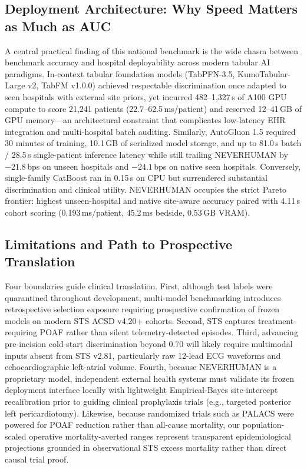 \subsection{Deployment Architecture: Why Speed Matters as Much as AUC}
A central practical finding of this national benchmark is the wide chasm between benchmark accuracy and hospital deployability across modern tabular AI paradigms. In-context tabular foundation models (TabPFN-3.5, KumoTabular-Large v2, TabFM v1.0.0) achieved respectable discrimination once adapted to seen hospitals with external site priors, yet incurred 482--1,327\,s of A100 GPU compute to score 21,241 patients (22.7--62.5\,ms/patient) and reserved 12--41\,GB of GPU memory---an architectural constraint that complicates low-latency EHR integration and multi-hospital batch auditing. Similarly, AutoGluon 1.5  required 30 minutes of training, 10.1\,GB of serialized model storage, and up to 81.0\,s batch / 28.5\,s single-patient inference latency while still trailing NEVERHUMAN by $-21.8$\,bps on unseen hospitals and $-24.1$\,bps on native  seen hospitals. Conversely, single-family CatBoost ran in 0.15\,s on CPU but surrendered substantial discrimination and clinical utility. NEVERHUMAN occupies the strict Pareto frontier: highest unseen-hospital and native site-aware accuracy paired with 4.11\,s cohort scoring (0.193\,ms/patient, 45.2\,ms bedside, 0.53\,GB VRAM).

\subsection{Limitations and Path to Prospective Translation}
Four boundaries guide clinical translation. First, although test labels were quarantined throughout development, multi-model benchmarking introduces retrospective selection exposure requiring prospective confirmation of frozen models on modern STS ACSD v4.20+ cohorts.\cite{dwork2015reusable} Second, STS  captures treatment-requiring POAF rather than silent telemetry-detected episodes.\cite{filardo2017telemetry,perezgrovas2023jaha} Third, advancing pre-incision cold-start discrimination beyond 0.70 will likely require multimodal inputs absent from STS v2.81, particularly raw 12-lead ECG waveforms and echocardiographic left-atrial volume.\cite{han2025aiecg,khalpey2026digital} Fourth, because NEVERHUMAN is a proprietary model, independent external health systems must validate its frozen deployment interface locally with lightweight Empirical-Bayes site-intercept recalibration prior to guiding clinical prophylaxis trials (e.g., targeted posterior left pericardiotomy).\cite{gaudino2021palacs} Likewise, because randomized trials such as PALACS were powered for POAF reduction rather than all-cause mortality, our population-scaled operative mortality-averted ranges represent transparent epidemiological projections grounded in observational STS excess mortality rather than direct causal trial proof.

